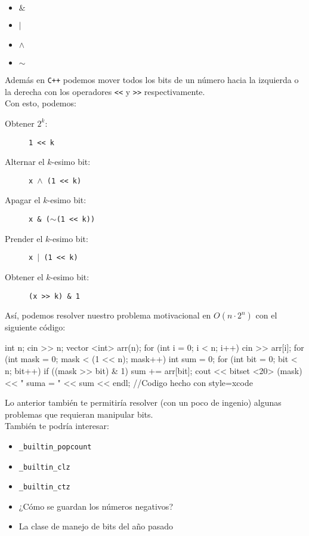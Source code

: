 \documentclass[a4paper,11pt]{article}
\begin{document}
\begin{itemize}
\item $\&$
\item $\vert$
\item $\wedge$
\item $\sim$
\end{itemize}
Además en \texttt{C++} podemos mover todos los bits de un número hacia la izquierda o la derecha con los operadores \texttt{<<} y \texttt{>>} respectivamente.\\
Con esto, podemos:
\begin{description}
\item[Obtener $2^{k}$:] \texttt{1 << k}
\item[Alternar el $k$-esimo bit:] \texttt{x $\wedge$ (1 << k)}
\item[Apagar el $k$-esimo bit:] \texttt{x \& ($\sim$(1 << k))}
\item[Prender el $k$-esimo bit:] \texttt{x $\vert$ (1 << k)}
\item[Obtener el $k$-esimo bit:] \texttt{(x >> k) \& 1}
\end{description}
Así, podemos resolver nuestro problema motivacional en $O(n\cdot 2^{n})$ con el siguiente código:
\begin{pyglist}[language=c++,caption={Problema motivacional 2},style=xcode]
int n;
  cin >> n;
  vector <int> arr(n);
  for (int i = 0; i < n; i++) cin >> arr[i];
  for (int mask = 0; mask < (1 << n); mask++) {
    int sum = 0;
    for (int bit = 0; bit < n; bit++) {
      if ((mask >> bit) & 1) sum += arr[bit];
    }
    cout << bitset <20> (mask) << " suma = " << sum << endl;
  }
//Codigo hecho con style=xcode
\end{pyglist}
Lo anterior también te permitiría resolver (con un poco de ingenio) algunas problemas que requieran manipular bits.\\
También te podría interesar:
\begin{itemize}
\item \texttt{\_builtin\_popcount}
\item \texttt{\_builtin\_clz}
\item \texttt{\_builtin\_ctz}
\item ¿Cómo se guardan los números negativos?
\item La clase de manejo de bits del año pasado
\end{itemize}
\newpage
\end{document}
